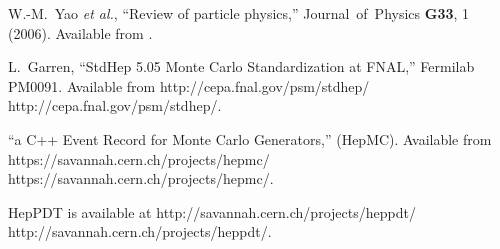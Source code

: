 \documentclass[11pt,letterpaper]{article}
\begin{document}
\begin{thebibliography}{99}
  W.-M.~Yao {\it et al.}, ``Review of particle physics,''
  Journal\ of\ Physics {\bf G33}, 1 (2006).
  Available from .


  L.~Garren, ``StdHep 5.05 Monte Carlo Standardization at FNAL,''
  Fermilab PM0091. Available from 
  \htmladdnormallink
  {http://cepa.fnal.gov/psm/stdhep/}
  {http://cepa.fnal.gov/psm/stdhep/}.

  ``a C++ Event Record for Monte Carlo Generators,'' (HepMC).
  Available from 
  \htmladdnormallink
  {https://savannah.cern.ch/projects/hepmc/}
  {https://savannah.cern.ch/projects/hepmc/}.

  HepPDT is available at \htmladdnormallink
  {http://savannah.cern.ch/projects/heppdt/}
  {http://savannah.cern.ch/projects/heppdt/}.

\end{thebibliography}

%
%
\end{document}
